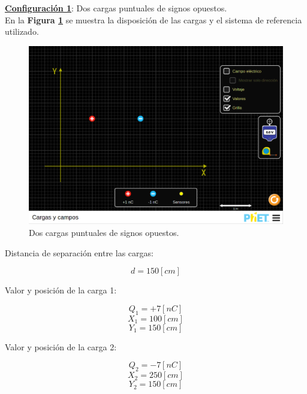\documentclass[letter,11pt]{article}
\begin{document}
\textbf{\underline{Configuración 1}}: Dos cargas puntuales de signos opuestos. \\

En la \textbf{Figura \ref{figura2}} se muestra la disposición de las cargas y el
sistema de referencia utilizado.

\begin{figure}[!h]
\centering
\includegraphics[scale=0.34]{resources/figura02.eps}
\caption{Dos cargas puntuales de signos opuestos.}
\label{figura2}
\end{figure}

Distancia de separación entre las cargas:

\begin{equation*}
    d = 150 [cm]
\end{equation*}

Valor y posición de la carga 1:

\begin{equation*}
    Q_1 = +7 [nC]
\end{equation*}
\begin{equation*}
    X_1 = 100 [cm]
\end{equation*}
\begin{equation*}
    Y_1 = 150 [cm]
\end{equation*}

Valor y posición de la carga 2:

\begin{equation*}
    Q_2 = -7 [nC]
\end{equation*}
\begin{equation*}
    X_2 = 250 [cm]
\end{equation*}
\begin{equation*}
    Y_2 = 150 [cm]
\end{equation*}
\end{document}
